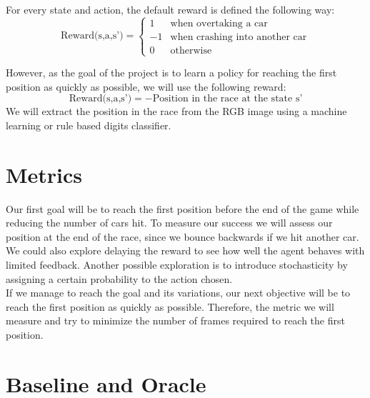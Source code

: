 \documentclass[10pt,twocolumn,letterpaper]{article}
\begin{document}
For every state and action, the default reward is defined the following way: \[ \text{Reward(s,a,s')} = \begin{cases}1 & \text{when overtaking a car}\\-1 & \text{when crashing into another car} \\0 & \text{otherwise}\end{cases}\]


However, as the goal of the project is to learn a policy for reaching the first position as quickly as possible, we will use the following reward:
\[\text{Reward(s,a,s')} = - \text{Position in the race at the state s'}\]
We will extract the position in the race from the RGB image using a machine learning or rule based digits classifier.



\section*{Metrics}

Our first goal will be to reach the first position before the end of the game while reducing the number of cars hit. To measure our success we will assess our position at the end of the race, since we bounce backwards if we hit another car.\\

We could also explore delaying the reward to see how well the agent behaves with limited feedback. Another possible exploration is to introduce stochasticity by assigning a certain probability to the action chosen.
\\

If we manage to reach the goal and its variations, our next objective will be to reach the first position as quickly as possible. Therefore, the metric we will measure and try to minimize the number of frames required to reach the first position.






\section*{Baseline and Oracle}
\end{document}
